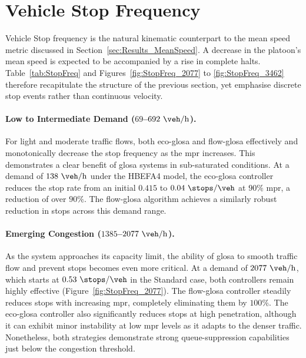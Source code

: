 \section{Vehicle Stop Frequency}
\label{sec:Results_Stops}

Vehicle Stop frequency is the natural kinematic counterpart to the mean speed metric discussed in Section~\vref{sec:Results_MeanSpeed}. A decrease in the platoon’s mean speed is expected to be accompanied by a rise in complete halts. Table~\vref{tab:StopFreq} and Figures~\vref{fig:StopFreq_2077} to \vref{fig:StopFreq_3462} therefore recapitulate the structure of the previous section, yet emphasise discrete stop events rather than continuous velocity.

\paragraph{Low to Intermediate Demand ($69$--$692~\unit{\veh\per\hour}$).}
For light and moderate traffic flows, both \ac{eco-glosa} and \ac{flow-glosa} effectively and monotonically decrease the stop frequency as the \ac{mpr} increases. This demonstrates a clear benefit of \ac{glosa} systems in sub-saturated conditions. At a demand of $138~\unit{\veh\per\hour}$ under the HBEFA4 model, the \ac{eco-glosa} controller reduces the stop rate from an initial $0.415$ to $0.04~\unit{\stops\per\veh}$ at $90\%$ \ac{mpr}, a reduction of over $90\%$. The \ac{flow-glosa} algorithm achieves a similarly robust reduction in stops across this demand range.

\paragraph{Emerging Congestion ($1385$--$2077~\unit{\veh\per\hour}$).}
As the system approaches its capacity limit, the ability of \ac{glosa} to smooth traffic flow and prevent stops becomes even more critical. At a demand of $2077~\unit{\veh\per\hour}$, which starts at $0.53~\unit{\stops\per\veh}$ in the Standard case, both controllers remain highly effective (Figure~\vref{fig:StopFreq_2077}). The \ac{flow-glosa} controller steadily reduces stops with increasing \ac{mpr}, completely eliminating them by $100\%$. The \ac{eco-glosa} controller also significantly reduces stops at high penetration, although it can exhibit minor instability at low \ac{mpr} levels as it adapts to the denser traffic. Nonetheless, both strategies demonstrate strong queue-suppression capabilities just below the congestion threshold.

